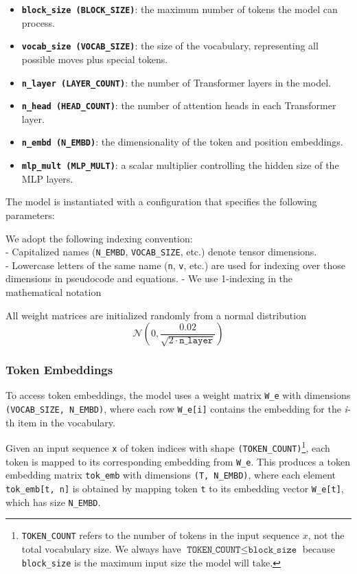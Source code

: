 \documentclass[11pt]{article}
\providecommand{\tightlist}{%
      \setlength{\itemsep}{0pt}\setlength{\parskip}{0pt}}
\begin{document}
\begin{itemize}
\tightlist
\item
  \textbf{\texttt{block\_size\ (BLOCK\_SIZE)}}: the maximum number of
  tokens the model can process.\\
\item
  \textbf{\texttt{vocab\_size\ (VOCAB\_SIZE)}}: the size of the
  vocabulary, representing all possible moves plus special tokens.\\
\item
  \textbf{\texttt{n\_layer\ (LAYER\_COUNT)}}: the number of Transformer
  layers in the model.\\
\item
  \textbf{\texttt{n\_head\ (HEAD\_COUNT)}}: the number of attention
  heads in each Transformer layer.\\
\item
  \textbf{\texttt{n\_embd\ (N\_EMBD)}}: the dimensionality of the token
  and position embeddings.\\
\item
  \textbf{\texttt{mlp\_mult\ (MLP\_MULT)}}: a scalar multiplier
  controlling the hidden size of the MLP layers.
\end{itemize}

The model is instantiated with a configuration that specifies the
following parameters:

We adopt the following indexing convention:\\
- Capitalized names (\texttt{N\_EMBD}, \texttt{VOCAB\_SIZE}, etc.)
denote tensor dimensions.\\
- Lowercase letters of the same name (\texttt{n}, \texttt{v}, etc.) are
used for indexing over those dimensions in pseudocode and equations.
- We use 1-indexing in the mathematical notation

All weight matrices are initialized randomly from a normal distribution
\[
\mathcal{N}\left(0, \frac{0.02}{\sqrt{2 \cdot \texttt{n\_layer}}} \right)
\]

    \subsubsection{Token Embeddings}\label{token-embeddings}

To access token embeddings, the model uses a weight matrix \texttt{W\_e}
with dimensions \texttt{(VOCAB\_SIZE,\ N\_EMBD)}, where each row
\texttt{W\_e{[}i{]}} contains the embedding for the \emph{i}-th item in
the vocabulary.

Given an input sequence \texttt{x} of token indices with shape
\texttt{(TOKEN\_COUNT)}\footnote{\texttt{TOKEN\_COUNT} refers to the number of tokens in the input sequence $x$, not the total vocabulary size. We always have $\texttt{TOKEN\_COUNT} \leq \texttt{block\_size}$ because \texttt{block\_size} is the maximum input size the model will take.}, each token is mapped to its
corresponding embedding from \texttt{W\_e}. This produces a token
embedding matrix \texttt{tok\_emb} with dimensions
\texttt{(T,\ N\_EMBD)}, where each element \texttt{tok\_emb{[}t,\ n{]}}
is obtained by mapping token \texttt{t} to its embedding vector
\texttt{W\_e{[}t{]}}, which has size \texttt{N\_EMBD}.
\end{document}
